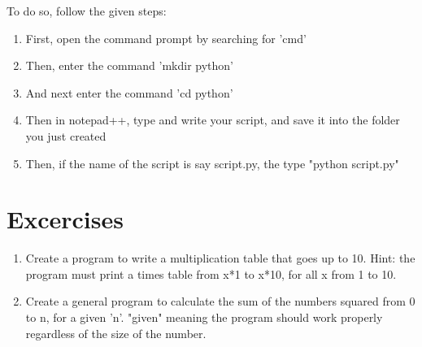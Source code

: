 To do so, follow the given steps:
\begin{enumerate}
\item First, open the command prompt by searching for 'cmd'
\item  Then, enter the command 'mkdir python'
\item And next enter the command 'cd python'
\item Then in notepad++, type and write your script, and save it into the folder you just created
\item Then, if the name of the script is say script.py, the type "python script.py"
\end{enumerate}
\newpage
\section{Excercises}
\begin{enumerate}
\item Create a program to write a multiplication table that goes up to 10. Hint: the program must print a times table from x*1 to x*10, for all x from 1 to 10.
\item Create a general program to calculate the sum of the numbers squared from 0 to n, for a given 'n'. "given" meaning the program should work properly regardless of the size of the number.
\end{enumerate}
